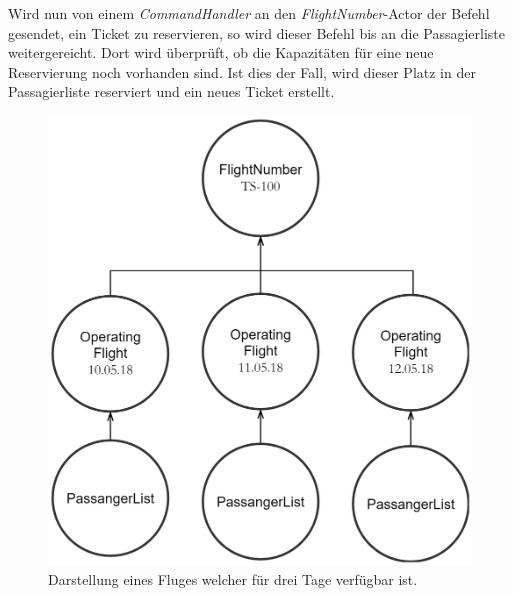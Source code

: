Wird nun von einem \textit{CommandHandler} an den \textit{FlightNumber}-Actor der Befehl gesendet, ein Ticket zu reservieren, so wird dieser Befehl bis an die Passagierliste weitergereicht. Dort wird überprüft, ob die Kapazitäten für eine neue Reservierung noch vorhanden sind. Ist dies der Fall, wird dieser Platz in der Passagierliste reserviert und ein neues Ticket erstellt. 
\begin{figure}
    \centering
    \includegraphics[width=0.65\linewidth]{gfx/implementation/FlightNumberSample}
    \caption{Darstellung eines Fluges welcher für drei Tage verfügbar ist.}
    \label{fig:implementation:entityFlightNumber}
\end{figure} 

